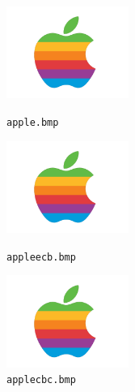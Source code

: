 \documentclass[letterpaper]{article}
\begin{document}
\begin{figure}
    \centering
    \begin{minipage}{4cm}
        \includegraphics[width=4cm]{apple.png}
        \caption{\texttt{apple.bmp}}
        \label{fig:apple}
    \end{minipage}
    \begin{minipage}{4cm}
            \includegraphics[width=4cm]{apple.png}
            \caption{\texttt{appleecb.bmp}}
            \label{fig:appleecb}
    \end{minipage}
    \begin{minipage}{4cm}
            \includegraphics[width=4cm]{apple.png}
            \caption{\texttt{applecbc.bmp}}
            \label{fig:applecbc}
    \end{minipage}
    \hfill
\end{figure}
\end{document}
